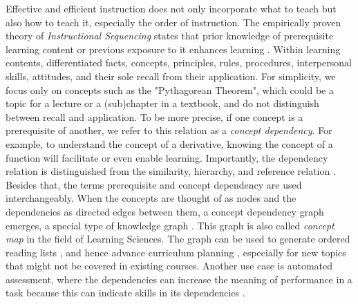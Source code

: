 \documentclass{article}
\begin{document}
Effective and efficient instruction does not only incorporate what to teach but also how to teach it, especially the order of instruction. The empirically proven theory of \textit{Instructional Sequencing} states that prior knowledge of prerequisite learning content or previous exposure to it enhances learning \citep{morrison2019designing}.
Within learning contents, \cite{merrill1983component} differentiated facts, concepts, principles, rules, procedures, interpersonal skills, attitudes, and their sole recall from their application.
For simplicity, we focus only on concepts such as the "Pythagorean Theorem", which could be a topic for a lecture or a (sub)chapter in a textbook, and do not distinguish between recall and application.
To be more precise, if one concept is a prerequisite of another, we refer to this relation as a \textit{concept dependency}. For example, to understand the concept of a derivative, knowing the concept of a function will facilitate or even enable learning. Importantly, the dependency relation is distinguished from the similarity, hierarchy, and reference relation \citep{gordon-etal-2016-modeling}. Besides that, the terms prerequisite and concept dependency are used interchangeably. When the concepts are thought of as nodes and the dependencies as directed edges between them, a concept dependency graph emerges, a special type of knowledge graph \citep{wang2016using}. This graph is also called \textit{concept map} in the field of Learning Sciences.
The graph can be used to generate ordered reading lists \citep{gordon-etal-2016-modeling}, and hence advance curriculum planning \citep{yang2015concept}, especially for new topics that might not be covered in existing courses. Another use case is automated assessment, where the dependencies can increase the meaning of performance in a task because this can indicate skills in its dependencies \citep{wang2016using}.
\end{document}
